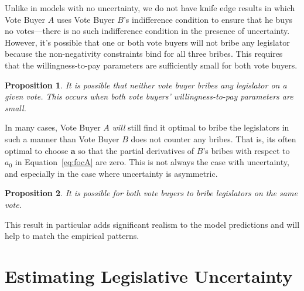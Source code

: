 \documentclass[12pt]{article}
\newtheorem{proposition}{Proposition}
\begin{document}
Unlike in models with no uncertainty, we do not have knife edge results in which Vote Buyer $A$ uses Vote Buyer $B$'s indifference condition to ensure that he buys no votes---there is no such indifference condition in the presence of uncertainty. However, it's possible that one or both vote buyers will not bribe any legislator because the non-negativity constraints bind for all three bribes. This requires that the willingness-to-pay parameters are sufficiently small for both vote buyers.
		
\begin{proposition}
  It is possible that neither vote buyer bribes any legislator on a given vote. This occurs when both vote buyers' willingness-to-pay parameters are small.
\end{proposition}

In many cases, Vote Buyer $A$ \textit{will} still find it optimal to bribe the legislators in such a manner than Vote Buyer $B$ does not counter any bribes. That is, its often optimal to choose $\bm a$ so that the partial derivatives of $B$'s bribes with respect to $a_0$ in Equation~\ref{eq:focA} are zero. This is not always the case with uncertainty, and especially in the case where uncertainty is asymmetric.

\begin{proposition}
  It is possible for both vote buyers to bribe legislators on the same vote.
	\label{prop:bothbribe}
\end{proposition}

This result in particular adds significant realism to the model predictions and will help to match the empirical patterns.
		
		
\section{Estimating Legislative Uncertainty}
\label{sec:est}
\end{document}
